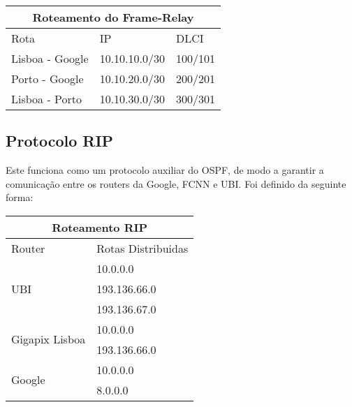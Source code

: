\vspace{3mm}
\setlength{\tabcolsep}{20pt}
\renewcommand{\arraystretch}{1.5}
\noindent
\begin{tabular}{ |p{3cm}|p{3cm}|p{1cm}|}
  \hline
  \multicolumn{3}{|c|}{Roteamento do Frame-Relay} \\
  \hline
  Rota            & IP            & DLCI          \\
  \hline
  Lisboa - Google & 10.10.10.0/30 & 100/101       \\
  Porto - Google  & 10.10.20.0/30 & 200/201       \\
  Lisboa - Porto  & 10.10.30.0/30 & 300/301       \\

  \hline
\end{tabular}
\vspace{5mm}

\subsection{Protocolo RIP}
Este funciona como um protocolo auxiliar do OSPF, de modo a garantir a
comunicação entre os routers da Google, FCNN e UBI.
Foi definido da seguinte forma:

\vspace{3mm}
\setlength{\tabcolsep}{20pt}
\renewcommand{\arraystretch}{1.5}
\noindent
\begin{tabular}{ |p{2cm}|p{3.25cm}|}
  \hline
  \multicolumn{2}{|c|}{Roteamento RIP}                   \\
  \hline
  Router                            & Rotas Distribuidas \\
  \hline
  \multirow{3}{1em}{UBI}            & 10.0.0.0           \\
                                    & 193.136.66.0       \\
                                    & 193.136.67.0       \\
  \hline
  \multirow{2}{1em}{Gigapix Lisboa} & 10.0.0.0           \\
                                    & 193.136.66.0       \\
  \hline
  \multirow{2}{1em}{Google}         & 10.0.0.0           \\
                                    & 8.0.0.0            \\
  \hline
\end{tabular}
\vspace{5mm}